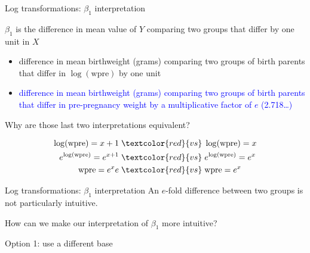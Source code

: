 \documentclass[10pt,t]{beamer}
\begin{document}
\begin{frame}{Log transformations: $\beta_1$ interpretation}

$\beta_1$ is the difference in mean value of $Y$ comparing two groups that differ by one unit in $X$

\begin{itemize}
	\item[] difference in mean birthweight (grams) comparing two groups of birth parents that differ in $\log(\text{wpre})$ by one unit
	\item[] \textcolor{blue}{difference in mean birthweight (grams) comparing two groups of birth parents that differ in pre-pregnancy weight by a multiplicative factor of $e$ (2.718\dots)}
\end{itemize}

\vspace{0.3cm}


Why are those last two interpretations equivalent?


\begin{align*}
\log(\text{wpre})  = x + 1 \hspace{0.1cm} & \textcolor{red}{vs} \hspace{0.1cm} \log(\text{wpre})  = x  \\
e^{\log(\text{wpre})}  = e^{x + 1}  \hspace{0.1cm} & \textcolor{red}{vs} \hspace{0.1cm} e^{\log(\text{wpre})}  = e^{x}\\
\text{wpre}  = e^x e \hspace{0.1cm} & \textcolor{red}{vs} \hspace{0.1cm} \text{wpre} = e^x
\end{align*}

\end{frame}

\begin{frame}{Log transformations: $\beta_1$ interpretation}
An $e$-fold difference between two groups is not particularly intuitive.

How can we make our interpretation of $\beta_1$ more intuitive?

\vspace{0.3cm}

Option 1: use a different base

\end{frame}
\end{document}
